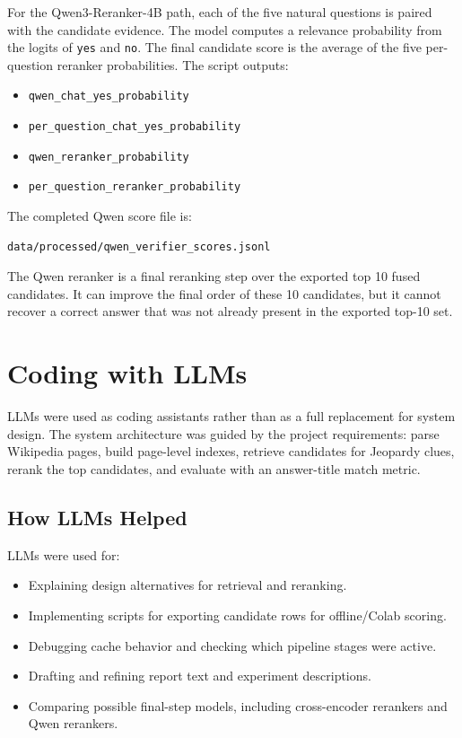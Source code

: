 \documentclass[11pt]{article}
\begin{document}
For the Qwen3-Reranker-4B path, each of the five natural questions is paired with the candidate evidence. The model computes a relevance probability from the logits of \texttt{yes} and \texttt{no}. The final candidate score is the average of the five per-question reranker probabilities. The script outputs:

\begin{itemize}[leftmargin=*]
  \item \texttt{qwen\_chat\_yes\_probability}
  \item \texttt{per\_question\_chat\_yes\_probability}
  \item \texttt{qwen\_reranker\_probability}
  \item \texttt{per\_question\_reranker\_probability}
\end{itemize}

The completed Qwen score file is:

\begin{verbatim}
data/processed/qwen_verifier_scores.jsonl
\end{verbatim}

The Qwen reranker is a final reranking step over the exported top 10 fused candidates. It can improve the final order of these 10 candidates, but it cannot recover a correct answer that was not already present in the exported top-10 set.

\section{Coding with LLMs}

LLMs were used as coding assistants rather than as a full replacement for system design. The system architecture was guided by the project requirements: parse Wikipedia pages, build page-level indexes, retrieve candidates for Jeopardy clues, rerank the top candidates, and evaluate with an answer-title match metric.

\subsection{How LLMs Helped}

LLMs were used for:

\begin{itemize}[leftmargin=*]
  \item Explaining design alternatives for retrieval and reranking.
  \item Implementing scripts for exporting candidate rows for offline/Colab scoring.
  \item Debugging cache behavior and checking which pipeline stages were active.
  \item Drafting and refining report text and experiment descriptions.
  \item Comparing possible final-step models, including cross-encoder rerankers and Qwen rerankers.
\end{itemize}
\end{document}
